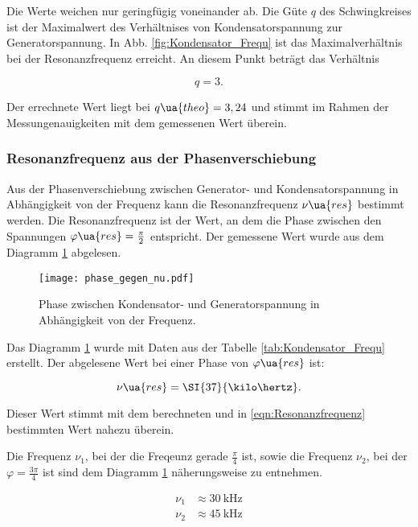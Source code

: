 Die Werte weichen nur geringfügig voneinander ab.
Die Güte $q$ des Schwingkreises ist der Maximalwert des Verhältnises von
Kondensatorspannung zur Generatorspannung.
In Abb. \ref{fig:Kondensator_Frequ} ist das Maximalverhältnis bei der
Resonanzfrequenz erreicht. An diesem Punkt beträgt das Verhältnis

\begin{equation*}
  q = 3.
\end{equation*}

Der errechnete Wert liegt bei $q\ua{theo} = 3,24$ und stimmt im Rahmen der
Messungenauigkeiten mit dem gemessenen Wert überein.

\subsubsection{Resonanzfrequenz aus der Phasenverschiebung}

Aus der Phasenverschiebung zwischen Generator- und Kondensatorspannung in Abhängigkeit
von der Frequenz kann die Resonanzfrequenz $\nu\ua{res}$ bestimmt werden.
Die Resonanzfrequenz ist der Wert, an dem die Phase zwischen den Spannungen
$\varphi\ua{res} = \frac{\pi}{2}$ entspricht.
Der gemessene Wert wurde aus dem Diagramm \ref{fig:Resonanz} abgelesen.

\begin{figure}
  \centering
  \texttt{[image: phase\_gegen\_nu.pdf]}
  \caption{Phase zwischen Kondensator- und Generatorspannung in Abhängigkeit von der Frequenz.}
  \label{fig:Resonanz}
\end{figure}


Das Diagramm \ref{fig:Resonanz} wurde mit Daten aus der Tabelle
\ref{tab:Kondensator_Frequ} erstellt.
Der abgelesene Wert bei einer Phase von $\varphi\ua{res}$ ist:

\begin{equation*}
  \nu\ua{res} = \SI{37}{\kilo\hertz}.
\end{equation*}

Dieser Wert stimmt mit dem berechneten und in \eqref{eqn:Resonanzfrequenz} bestimmten
Wert nahezu überein.

Die Frequenz $\nu_1$, bei der die Freqeunz gerade $\frac{\pi}{4}$ ist, sowie die
Frequenz $\nu_2$, bei der $\varphi = \frac{3\pi}{4}$ ist sind dem Diagramm \ref{fig:Resonanz}
näherungsweise zu entnehmen.

\begin{align*}
  \nu_1 &\approx \SI{30}{\kilo\hertz} \\
  \nu_2 &\approx \SI{45}{\kilo\hertz}
\end{align*}

